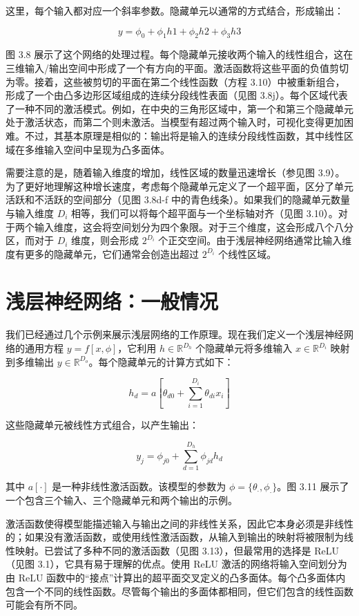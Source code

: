 这里，每个输入都对应一个斜率参数。隐藏单元以通常的方式结合，形成输出：

\[
y = \phi_0 + \phi_1h1 + \phi_2h2 + \phi_3h3 \tag{3.10}
\]


图 3.8 展示了这个网络的处理过程。每个隐藏单元接收两个输入的线性组合，这在三维输入/输出空间中形成了一个有方向的平面。激活函数将这些平面的负值剪切为零。接着，这些被剪切的平面在第二个线性函数（方程 3.10）中被重新组合，形成了一个由凸多边形区域组成的连续分段线性表面（见图 3.8j）。每个区域代表了一种不同的激活模式。例如，在中央的三角形区域中，第一个和第三个隐藏单元处于激活状态，而第二个则未激活。当模型有超过两个输入时，可视化变得更加困难。不过，其基本原理是相似的：输出将是输入的连续分段线性函数，其中线性区域在多维输入空间中呈现为凸多面体。


需要注意的是，随着输入维度的增加，线性区域的数量迅速增长（参见图 3.9）。为了更好地理解这种增长速度，考虑每个隐藏单元定义了一个超平面，区分了单元活跃和不活跃的空间部分（见图 3.8d-f 中的青色线条）。如果我们的隐藏单元数量与输入维度 \(D_i\) 相等，我们可以将每个超平面与一个坐标轴对齐（见图 3.10）。对于两个输入维度，这会将空间划分为四个象限。对于三个维度，这会形成八个八分区，而对于 \(D_i\) 维度，则会形成 \(2^{D_i}\) 个正交空间。由于浅层神经网络通常比输入维度有更多的隐藏单元，它们通常会创造出超过 \(2^{D_i}\) 个线性区域。

\section{浅层神经网络：一般情况}

我们已经通过几个示例来展示浅层网络的工作原理。现在我们定义一个浅层神经网络的通用方程 \( y = f[x, \phi] \)，它利用 \( h \in \mathbb{R}^{D_h} \) 个隐藏单元将多维输入 \( x \in \mathbb{R}^{D_i} \) 映射到多维输出 \( y \in \mathbb{R}^{D_o} \)。每个隐藏单元的计算方式如下：

\[
h_d = a \left[ \theta_{d0} + \sum_{i=1}^{D_i} \theta_{di}x_i \right] \tag{3.11}
\]


这些隐藏单元被线性方式组合，以产生输出：

\[
y_j = \phi_{j0} + \sum_{d=1}^{D_h} \phi_{jd}h_d \tag{3.12}
\]

其中 \(a[\cdot]\)  是一种非线性激活函数。该模型的参数为 \(\phi = \{ \theta_{\cdot}, \phi_{\cdot}\}\)。图 3.11 展示了一个包含三个输入、三个隐藏单元和两个输出的示例。

激活函数使得模型能描述输入与输出之间的非线性关系，因此它本身必须是非线性的；如果没有激活函数，或使用线性激活函数，从输入到输出的映射将被限制为线性映射。已尝试了多种不同的激活函数（见图 3.13），但最常用的选择是 ReLU（见图 3.1），它具有易于理解的优点。使用 ReLU 激活的网络将输入空间划分为由 ReLU 函数中的“接点”计算出的超平面交叉定义的凸多面体。每个凸多面体内包含一个不同的线性函数。尽管每个输出的多面体都相同，但它们包含的线性函数可能会有所不同。
